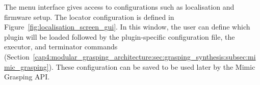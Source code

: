\begin{figure}[h!]
\end{figure}

The menu interface gives access to configurations such as localisation and firmware setup. The locator configuration is defined in Figure~\ref{fig:localisation_screen_gui}. In this window, the user can define which plugin will be loaded followed by the plugin-specific configuration file, the executor, and terminator commands (Section~\ref{cap4:modular_grasping_architecture:sec:grasping_synthesis:subsec:mimic_grasping}). These configuration can be saved to be used later by the Mimic Grasping API.

